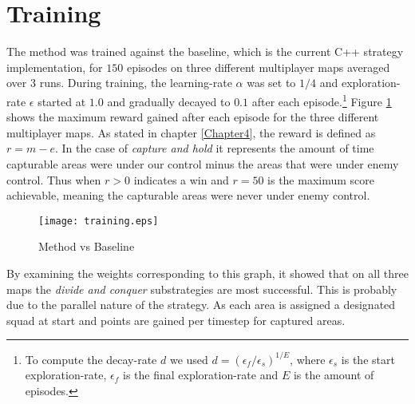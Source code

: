 \section{Training}
The method was trained against the baseline, which is the current C++ strategy
implementation, for $150$ episodes on three different multiplayer maps averaged
over $3$ runs. During training, the learning-rate $\alpha$ was set to $1/4$ and
exploration-rate $\epsilon$ started at $1.0$ and gradually decayed to $0.1$
after each episode.\footnote{To compute the decay-rate $d$ we used $d =
(\epsilon_f / \epsilon_s)^{1/E}$, where $\epsilon_s$ is the start
exploration-rate, $\epsilon_f$ is the final exploration-rate and $E$ is the
amount of episodes.} Figure \ref{fig:training} shows the maximum reward gained
after each episode for the three different multiplayer maps. As stated in
chapter \ref{Chapter4}, the reward is defined as $r = m - e$. In the case of
\emph{capture and hold} it represents the amount of time capturable areas were
under our control minus the areas that were under enemy control. Thus when $r >
0$ indicates a win and $r = 50$ is the maximum score achievable, meaning the
capturable areas were never under enemy control.
\begin{figure}[!ht]
\centering
\texttt{[image: training.eps]}
\caption{Method vs Baseline}
\label{fig:training}
\end{figure}
By examining the weights corresponding to this graph, it showed that on all
three maps the \emph{divide and conquer} substrategies are most successful.
This is probably due to the parallel nature of the strategy. As each area is
assigned a designated squad at start and points are gained per timestep for
captured areas.


